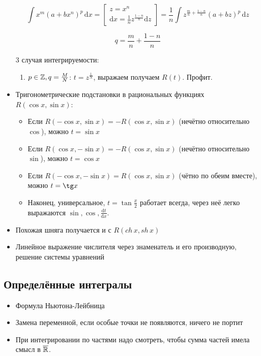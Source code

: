 \documentclass[12pt, a4paper]{article}
\begin{document}
\begin{itemize}
      \begin{equation}
        \int x^{m}(a+bx^{n})^{p}\,\mathrm{d}x = \begin{bmatrix} z = x^n \\ \mathrm{d}x = \frac{1}{n} z^{\frac{1 - n}{n}} \mathrm{d}z \end{bmatrix} = \frac{1}{n} \int z^{\frac{m}{n} + \frac{1 - n}{n}}(a+bz)^{p}\,\mathrm{d}z
      \end{equation}

      \begin{equation}
        q = \frac{m}{n} + \frac{1 - n}{n}
      \end{equation}
      
      3 случая интегрируемости:
      \begin{enumerate}
        \item $p \in {\mathbb{Z}}, q = \frac{M}{N}$: $t = z^{\frac{1}{N}}$, выражаем получаем $R(t)$. Профит.
      \end{enumerate}
      \item Тригонометрические подстановки в рациональных функциях $R(\cos x, \sin x)$:
      \begin{itemize}
        \item Если $R(-\cos x, \sin x) = -R(\cos x, \sin x)$ (нечётно относительно $\cos$), можно $t = \sin x$
        \item Если $R(\cos x, -\sin x) = -R(\cos x, \sin x)$ (нечётно относительно $\sin$), можно $t = \cos x$
        \item Если $R(-\cos x, -\sin x) = R(\cos x, \sin x)$ (чётно по обеим вместе), можно $t = \tg x$
        \item Наконец, универсальное, $t = \tan \frac{x}{2}$ работает всегда, через неё легко выражаются $\sin, \cos, \frac{\mathrm{d}t}{\mathrm{d}x}$.
      \end{itemize}
      \item Похожая шняга получается и с $R(ch\, x, sh\, x)$
      \item Линейное выражение числителя через знаменатель и его производную, решение системы уравнений
    \end{itemize}
  
  \subsection{Определённые интегралы}
  
  \begin{itemize}
    \item Формула Ньютона-Лейбница
    \item Замена переменной, если особые точки не появляются, ничего не портит
    \item При интегрировании по частями надо смотреть, чтобы сумма частей имела смысл в $\overline{{\mathbb{R}}}$.
  \end{itemize}
\end{document}
